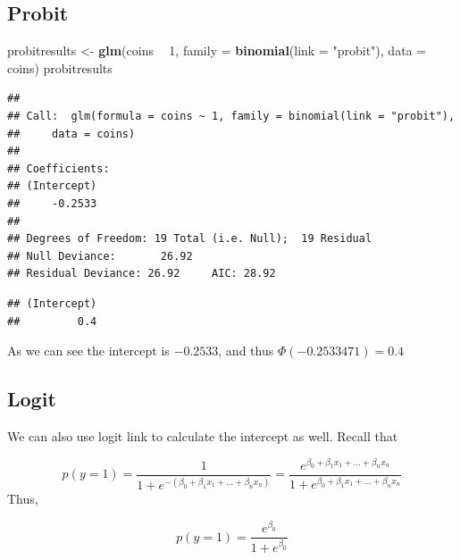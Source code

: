 \documentclass[
]{book}
\newenvironment{Shaded}{\begin{snugshade}}{\end{snugshade}}
\newcommand{\DataTypeTok}[1]{\textcolor[rgb]{0.13,0.29,0.53}{#1}}
\newcommand{\DecValTok}[1]{\textcolor[rgb]{0.00,0.00,0.81}{#1}}
\newcommand{\KeywordTok}[1]{\textcolor[rgb]{0.13,0.29,0.53}{\textbf{#1}}}
\newcommand{\NormalTok}[1]{#1}
\newcommand{\OperatorTok}[1]{\textcolor[rgb]{0.81,0.36,0.00}{\textbf{#1}}}
\newcommand{\StringTok}[1]{\textcolor[rgb]{0.31,0.60,0.02}{#1}}
\begin{document}
\hypertarget{probit-1}{%
\subsection{Probit}\label{probit-1}}

\begin{Shaded}
\begin{Highlighting}[]
\NormalTok{probitresults <-}\StringTok{ }\KeywordTok{glm}\NormalTok{(coins }\OperatorTok{~}\StringTok{ }\DecValTok{1}\NormalTok{, }\DataTypeTok{family =} \KeywordTok{binomial}\NormalTok{(}\DataTypeTok{link =} \StringTok{"probit"}\NormalTok{), }\DataTypeTok{data =}\NormalTok{ coins)}
\NormalTok{probitresults}
\end{Highlighting}
\end{Shaded}

\begin{verbatim}
## 
## Call:  glm(formula = coins ~ 1, family = binomial(link = "probit"), 
##     data = coins)
## 
## Coefficients:
## (Intercept)  
##     -0.2533  
## 
## Degrees of Freedom: 19 Total (i.e. Null);  19 Residual
## Null Deviance:       26.92 
## Residual Deviance: 26.92     AIC: 28.92
\end{verbatim}

\begin{Shaded}
\end{Shaded}

\begin{verbatim}
## (Intercept) 
##         0.4
\end{verbatim}

As we can see the intercept is \(-0.2533\), and thus \(\Phi(-0.2533471)=0.4\)

\hypertarget{logit-1}{%
\subsection{Logit}\label{logit-1}}

We can also use logit link to calculate the intercept as well. Recall that

\[p(y=1)=\frac{1}{1+e^{-(\beta_0+\beta_1x_1+...+\beta_nx_n)}}=\frac{e^{\beta_0+\beta_1x_1+...+\beta_nx_n}}{1+e^{\beta_0+\beta_1x_1+...+\beta_nx_n}}\]
Thus,

\[p(y=1)=\frac{e^{\beta_0}}{1+e^{\beta_0}}\]
\end{document}
